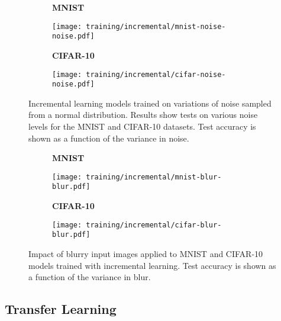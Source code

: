 \documentclass[conference]{IEEEtran}
\begin{document}
\begin{figure}[H]
    \centering
    \begin{subfigure}[h]{0.30\textwidth}
        \centering
        \textbf{MNIST}\par\medskip
        \texttt{[image: training/incremental/mnist-noise-noise.pdf]}
        \caption{} 
        \label{fig:incremental-mnist-noise}
    \end{subfigure}
    \quad
    \begin{subfigure}[h]{0.30\textwidth}  
        \centering 
        \textbf{CIFAR-10}\par\medskip
        \texttt{[image: training/incremental/cifar-noise-noise.pdf]}
        \caption{} 
        \label{fig:incremental-cifar-noise}
    \end{subfigure}
    \captionsetup{width=0.80\linewidth}
    \caption{Incremental learning models trained on variations of noise sampled from a normal distribution. Results show tests on various noise levels for the MNIST and CIFAR-10 datasets. Test accuracy is shown as a function of the variance in noise.} 
    \label{fig:incremental-noise}
\end{figure}

\begin{figure}[H]
    \centering
    \begin{subfigure}[h]{0.30\textwidth}
        \centering
        \textbf{MNIST}\par\medskip
        \texttt{[image: training/incremental/mnist-blur-blur.pdf]}
        \caption{} 
        \label{fig:incremental-mnist-blur}
    \end{subfigure}
    \quad
    \begin{subfigure}[h]{0.30\textwidth}  
        \centering 
        \textbf{CIFAR-10}\par\medskip
        \texttt{[image: training/incremental/cifar-blur-blur.pdf]}
        \caption{} 
        \label{fig:incremental-cifar-blur}
    \end{subfigure}
    \captionsetup{width=0.80\linewidth}
    \caption{Impact of blurry input images applied to MNIST and CIFAR-10 models trained with incremental learning. Test accuracy is shown as a function of the variance in blur.} 
    \label{fig:incremental-blur}
\end{figure}

\newpage

\subsection{Transfer Learning}
\end{document}
